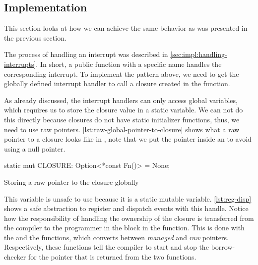 \subsection{Implementation}

This section looks at how we can achieve the same behavior as was presented in the previous section.

The process of handling an interrupt was described in \autoref{sec:impl:handling-interrupts}.
In short, a public function with a specific name handles the corresponding interrupt.
To implement the pattern above, we need to get the globally defined interrupt handler  to call a closure created in the  function.

As already discussed, the interrupt handlers can only access global variables, which requires us to store the closure value in a static variable.
We can not do this directly because closures do not have static initializer functions, thus, we need to use raw pointers.
\autoref{lst:raw-global-pointer-to-closure} shows what a raw pointer to a closure looks like in {\rust}, note that we put the pointer inside an  to avoid using a null pointer.

\begin{listing}[H]
  \begin{rustcode}
static mut CLOSURE: Option<*const Fn()> = None;
  \end{rustcode}
  \caption{Storing a raw pointer to the closure globally}
  \label{lst:raw-global-pointer-to-closure}
\end{listing}

This  variable is unsafe to use because it is a static mutable variable.
\autoref{lst:reg-disp} shows a safe abstraction to register and dispatch events with this handle.
Notice how the responsibility of handling the ownership of the closure is transferred from the compiler to the programmer in the {\unsafe} block in the  function.
This is done with the  and the  functions, which converts between \emph{managed} and \emph{raw} pointers.
Respectively, these functions tell the compiler to start and stop the borrow-checker for the pointer that is returned from the two functions.

